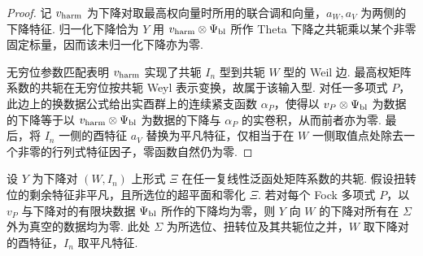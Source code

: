 \begin{proof}
记 $v_{\rm harm}$ 为下降对取最高权向量时所用的联合调和向量，$a_W,a_V$ 为两侧的下降特征. 归一化下降恰为 $Y$ 用 $v_{\rm harm}\otimes\Psi_{\rm bl}$ 所作 Theta 下降之共轭乘以某个非零固定标量，因而该未归一化下降亦为零.

无穷位参数匹配表明 $v_{\rm harm}$ 实现了共轭 $I_n$ 型到共轭 $W$ 型的 Weil 边. 最高权矩阵系数的共轭在无穷位按共轭 Weyl 表示变换，故属于该输入型. 对任一多项式 $P$，此边上的换数据公式给出实酉群上的连续紧支函数 $\alpha_P$，使得以 $v_P\otimes\Psi_{\rm bl}$ 为数据的下降等于以 $v_{\rm harm}\otimes\Psi_{\rm bl}$ 为数据的下降与 $\alpha_P$ 的实卷积，从而前者亦为零. 最后，将 $I_n$ 一侧的酉特征 $a_V$ 替换为平凡特征，仅相当于在 $W$ 一侧取值点处除去一个非零的行列式特征因子，零函数自然仍为零.
\end{proof}

\begin{lemma}
\label{lem:c-false-bottom-finite}
\emitthmsource
设 $Y$ 为下降对 $(W,I_n)$ 上形式 $\Xi$ 在任一复线性泛函处矩阵系数的共轭. 假设扭转位的剩余特征非平凡，且所选位的超平面和零化 $\Xi$. 若对每个 Fock 多项式 $P$，以 $v_P$ 与下降对的有限块数据 $\Psi_{\rm bl}$ 所作的下降均为零，则 $Y$ 向 $W$ 的下降对所有在 $\Sigma$ 外为真空的数据均为零. 此处 $\Sigma$ 为所选位、扭转位及其共轭位之并，$W$ 取下降对的酉特征，$I_n$ 取平凡特征.
\end{lemma}

